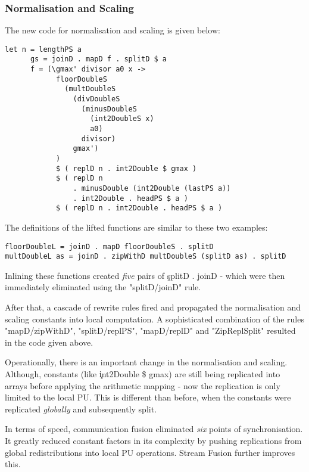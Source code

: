     \subsubsection{Normalisation and Scaling}
    The new code for normalisation and scaling is given below:
    \begin{lstlisting}
let n = lengthPS a
      gs = joinD . mapD f . splitD $ a
      f = (\gmax' divisor a0 x ->
            floorDoubleS
              (multDoubleS
                (divDoubleS
                  (minusDoubleS
                    (int2DoubleS x)
                    a0)
                  divisor)
                gmax')
            )
            $ ( replD n . int2Double $ gmax )
            $ ( replD n
                . minusDouble (int2Double (lastPS a))
                . int2Double . headPS $ a )
            $ ( replD n . int2Double . headPS $ a )
    \end{lstlisting}
    The definitions of the lifted functions are similar to these two examples:
    \begin{lstlisting}
floorDoubleL = joinD . mapD floorDoubleS . splitD
multDoubleL as = joinD . zipWithD multDoubleS (splitD as) . splitD
    \end{lstlisting}
    Inlining these functions created \emph{five} pairs of \c{splitD . joinD} - which were then immediately
    eliminated using the "splitD/joinD" rule.
    
    After that, a cascade of rewrite rules fired and propagated the normalisation and scaling
    constants into local computation. A sophisticated combination of the rules
    "mapD/zipWithD", "splitD/replPS", "mapD/replD" and "ZipReplSplit" resulted in
    the code given above.
    
    Operationally, there is an important change in the normalisation and scaling.
    Although, constants (like \c{int2Double \$ gmax}) are still being replicated into arrays
    before applying the arithmetic mapping - now the replication
    is only limited to the local PU. This is different than before, when
    the constants were replicated \emph{globally} and subsequently split.
    
    In terms of speed, communication fusion eliminated \emph{six} points of synchronisation.
    It greatly reduced constant factors in its complexity by pushing
    replications from global redistributions into local PU operations.
    Stream Fusion further improves this.
    
    
